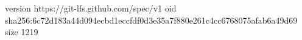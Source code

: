 version https://git-lfs.github.com/spec/v1
oid sha256:6c72d183a44d094ecbd1eccfdf0d3e35a7f880e261c4cc6768075afab6a49d69
size 1219
